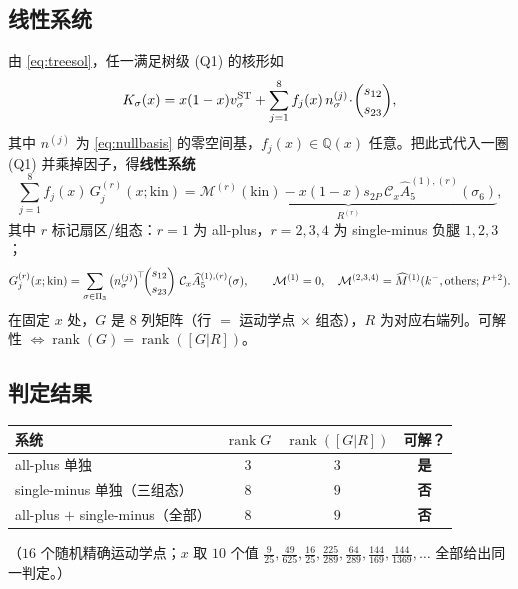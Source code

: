 \documentclass[11pt]{article}
\newcommand{\Cx}{\mathcal{C}_x}
\newcommand{\Mhat}{\widehat{M}}
\newcommand{\Ahat}{\widehat{A}}
\newcommand{\Pt}{P}
\begin{document}
\subsection{线性系统}
由 \eqref{eq:treesol}，任一满足树级 (Q1) 的核形如
\begin{equation}
K_\sigma(x)=x(1-x)v^{\rm ST}_\sigma+\sum_{j=1}^{8}f_j(x)\,n^{(j)}_\sigma\!\cdot\!\binom{s_{12}}{s_{23}},
\end{equation}
其中 $n^{(j)}$ 为 \eqref{eq:nullbasis} 的零空间基，$f_j(x)\in\mathbb Q(x)$ 任意。把此式代入一圈 (Q1) 并乘掉因子，得\textbf{线性系统}
\begin{equation}
\sum_{j=1}^{8}f_j(x)\,G_j^{(r)}(x;\text{kin})
=\underbrace{\mathcal M^{(r)}(\text{kin})-x(1-x)s_{2\Pt}\,\Cx\Ahat^{(1),(r)}_5(\sigma_6)}_{R^{(r)}},
\label{eq:linsys}
\end{equation}
其中 $r$ 标记扇区/组态：$r=1$ 为 all-plus，$r=2,3,4$ 为 single-minus 负腿 $1,2,3$；
\begin{equation}
G_j^{(r)}(x;\text{kin})=\sum_{\sigma\in\Pi_3}\big(n^{(j)}_\sigma\big)^{\!\top}\!\binom{s_{12}}{s_{23}}\ \Cx\Ahat^{(1),(r)}_5(\sigma),
\qquad \mathcal M^{(1)}=0,\quad \mathcal M^{(2,3,4)}=\Mhat^{(1)}(k^-,{\rm others};\Pt^{+2}).
\end{equation}
在固定 $x$ 处，$G$ 是 $8$ 列矩阵（行 $=$ 运动学点 $\times$ 组态），$R$ 为对应右端列。可解性 $\iff \operatorname{rank}(G)=\operatorname{rank}([G|R])$。

\subsection{判定结果}
\begin{center}
\begin{tabular}{lccc}
\toprule
系统 & $\operatorname{rank}G$ & $\operatorname{rank}([G|R])$ & 可解？\\
\midrule
all-plus 单独 & $3$ & $3$ & \textbf{是}\\
single-minus 单独（三组态） & $8$ & $9$ & \textbf{否}\\
all-plus $+$ single-minus（全部） & $8$ & $9$ & \textbf{否}\\
\bottomrule
\end{tabular}
\end{center}
（$16$ 个随机精确运动学点；$x$ 取 $10$ 个值 $\frac9{25},\frac{49}{625},\frac{16}{25},\frac{225}{289},\frac{64}{289},\frac{144}{169},\frac{144}{1369},\dots$ 全部给出同一判定。）
\end{document}
